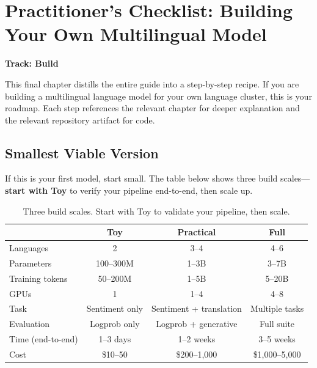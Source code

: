 \documentclass[11pt,a4paper]{article}
\begin{document}

\section{Practitioner's Checklist: Building Your Own Multilingual Model}
\label{ch:checklist}

\begin{center}
\colorbox{tipbg}{\textbf{Track: Build}}
\end{center}

This final chapter distills the entire guide into a step-by-step recipe. If you are building a multilingual language model for your own language cluster, this is your roadmap. Each step references the relevant chapter for deeper explanation and the relevant repository artifact for code.

\subsection{Smallest Viable Version}

If this is your first model, start small. The table below shows three build scales---\textbf{start with Toy} to verify your pipeline end-to-end, then scale up.

\begin{table}[H]
\centering
\begin{tabular}{lccc}
\toprule
& \textbf{Toy} & \textbf{Practical} & \textbf{Full} \\
\midrule
Languages & 2 & 3--4 & 4--6 \\
Parameters & 100--300M & 1--3B & 3--7B \\
Training tokens & 50--200M & 1--5B & 5--20B \\
GPUs & 1 & 1--4 & 4--8 \\
Task & Sentiment only & Sentiment + translation & Multiple tasks \\
Evaluation & Logprob only & Logprob + generative & Full suite \\
Time (end-to-end) & 1--3 days & 1--2 weeks & 3--5 weeks \\
Cost & \$10--50 & \$200--1,000 & \$1,000--5,000 \\
\bottomrule
\end{tabular}
\caption{Three build scales. Start with Toy to validate your pipeline, then scale.}
\end{table}
\end{document}

